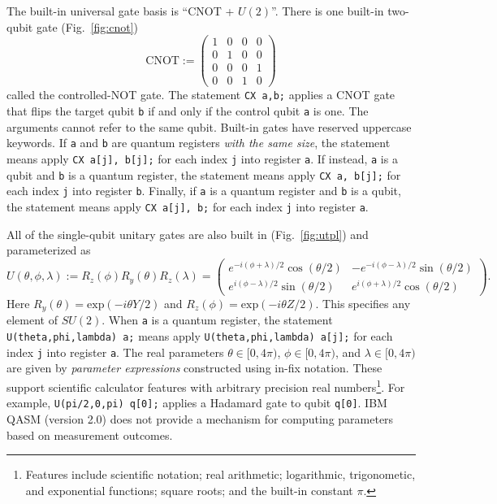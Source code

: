 \documentclass[USenglish,12pt,fleqn]{article} %
\newcommand*{\code}{\texttt}
\begin{document}
The built-in universal gate basis is ``CNOT + $U(2)$''. There is one built-in two-qubit gate (Fig.~\ref{fig:cnot})
\begin{equation}
\mathrm{CNOT} := \left(\begin{array}{cccc}
1 & 0 & 0 & 0 \\
0 & 1 & 0 & 0 \\
0 & 0 & 0 & 1 \\
0 & 0 & 1 & 0 \end{array}\right)
\end{equation}
called the controlled-NOT gate. The statement \code{CX a,b;} applies a CNOT gate that flips the target qubit \code{b} if and only if the control qubit \code{a} is one. The arguments cannot refer to the same qubit. Built-in gates have reserved uppercase keywords. If \code{a} and \code{b} are quantum registers {\em with the same size}, the statement means apply \code{CX a[j], b[j];} for each index \code{j} into register \code{a}. If instead, \code{a} is a qubit and \code{b} is a quantum register, the statement means apply \code{CX a, b[j];} for each index \code{j} into register \code{b}. Finally, if \code{a} is a quantum register and \code{b} is a qubit, the statement means apply \code{CX a[j], b;} for each index \code{j} into register \code{a}.

All of the single-qubit unitary gates are also built in (Fig.~\ref{fig:utpl}) and parameterized as
\begin{equation}
U(\theta,\phi,\lambda) := R_z(\phi)R_y(\theta)R_z(\lambda) = \left(\begin{array}{cc} e^{-i(\phi+\lambda)/2}\cos(\theta/2) & -e^{-i(\phi-\lambda)/2}\sin(\theta/2) \\
e^{i(\phi-\lambda)/2}\sin(\theta/2) & e^{i(\phi+\lambda)/2}\cos(\theta/2) \end{array}\right).
\end{equation}
Here $R_y(\theta)=\mathrm{exp}(-i\theta Y/2)$ and $R_z(\phi)=\mathrm{exp}(-i\theta Z/2)$. This specifies any element of $SU(2)$. When \code{a} is a quantum register, the statement \code{U(theta,phi,lambda) a;} means apply \code{U(theta,phi,lambda) a[j];} for each index \code{j} into register \code{a}. The real parameters $\theta\in [0,4\pi)$, $\phi\in [0,4\pi)$, and $\lambda\in [0,4\pi)$ are given by {\it parameter expressions} constructed using in-fix notation. These support scientific calculator features with arbitrary precision real numbers\footnote{Features include scientific notation; real arithmetic; logarithmic, trigonometic, and exponential functions; square roots; and the built-in constant $\pi$.}. For example, \code{U(pi/2,0,pi) q[0];} applies a Hadamard gate to qubit \code{q[0]}. IBM QASM (version 2.0) does not provide a mechanism for computing parameters based on measurement outcomes.
\end{document}

